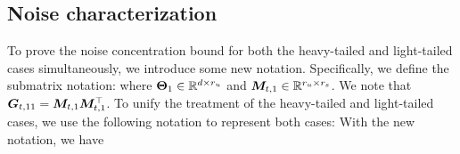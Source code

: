 \subsection{Noise characterization}
To prove the noise concentration bound for both the heavy-tailed and light-tailed cases simultaneously, we introduce some new notation. Specifically, we define the submatrix notation:
where $\boldsymbol{\Theta}_1 \in \mathbb{R}^{d \times r_u}$ and   $\boldsymbol{M}_{t,1}  \in \mathbb{R}^{r_u \times r_s}$.  We note that $\boldsymbol{G}_{t,11} =   \boldsymbol{M}_{t,1}  \boldsymbol{M}_{t,1}^\top$.    To unify the treatment of the heavy-tailed and light-tailed cases, we use the following notation to represent both cases:
With the new notation,  we have
